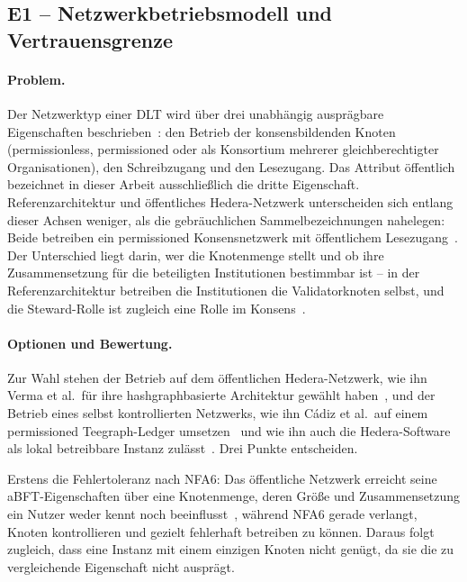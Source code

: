 \subsection{E1 -- Netzwerkbetriebsmodell und Vertrauensgrenze}
\label{subsec:e1-netzwerkmodell}

\paragraph{Problem.}
Der Netzwerktyp einer DLT wird über drei unabhängig ausprägbare Eigenschaften beschrieben~\cite{erler2024}: den Betrieb der konsensbildenden Knoten (permissionless, permissioned oder als Konsortium mehrerer gleichberechtigter Organisationen), den Schreibzugang und den Lesezugang. Das Attribut öffentlich bezeichnet in dieser Arbeit ausschließlich die dritte Eigenschaft. Referenzarchitektur und öffentliches Hedera-Netzwerk unterscheiden sich entlang dieser Achsen weniger, als die gebräuchlichen Sammelbezeichnungen nahelegen: Beide betreiben ein permissioned Konsensnetzwerk mit öffentlichem Lesezugang~\cite{erler2023, bairdharmon2019}. Der Unterschied liegt darin, wer die Knotenmenge stellt und ob ihre Zusammensetzung für die beteiligten Institutionen bestimmbar ist -- in der Referenzarchitektur betreiben die Institutionen die Validatorknoten selbst, und die Steward-Rolle ist zugleich eine Rolle im Konsens~\cite{erler2023, torongo2023}.

\paragraph{Optionen und Bewertung.}
Zur Wahl stehen der Betrieb auf dem öffentlichen Hedera-Netzwerk, wie ihn Verma et al.\ für ihre hashgraphbasierte Architektur gewählt haben~\cite{verma2024}, und der Betrieb eines selbst kontrollierten Netzwerks, wie ihn Cádiz et al.\ auf einem permissioned Teegraph-Ledger umsetzen~\cite{cadiz2025} und wie ihn auch die Hedera-Software als lokal betreibbare Instanz zulässt~\cite{hederanetworks}. Drei Punkte entscheiden.

Erstens die Fehlertoleranz nach NFA6: Das öffentliche Netzwerk erreicht seine aBFT-Eigenschaften über eine Knotenmenge, deren Größe und Zusammensetzung ein Nutzer weder kennt noch beeinflusst~\cite{bairdharmon2019}, während NFA6 gerade verlangt, Knoten kontrollieren und gezielt fehlerhaft betreiben zu können. Daraus folgt zugleich, dass eine Instanz mit einem einzigen Knoten nicht genügt, da sie die zu vergleichende Eigenschaft nicht ausprägt.

